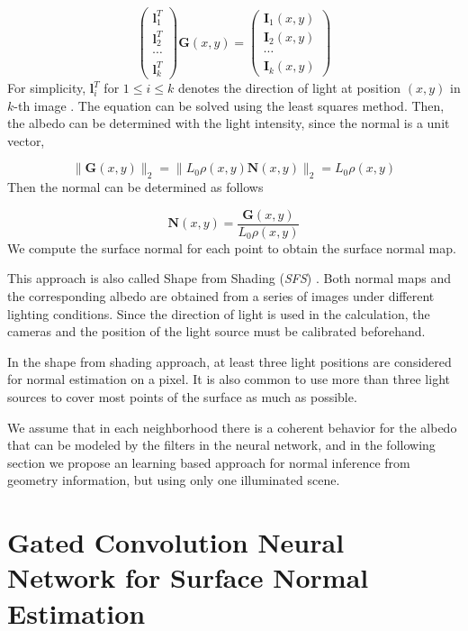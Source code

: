 \[ 
\begin{pmatrix}
	\textbf{l}_1^T \\
	\textbf{l}_2^T \\
	\cdots \\
	\textbf{l}_k^T
\end{pmatrix} \textbf{G}(x,y) = 
\begin{pmatrix}
	\textbf{I}_1(x,y) \\
	\textbf{I}_2(x,y) \\
	\cdots \\
	\textbf{I}_k(x,y)
\end{pmatrix}
\]
For simplicity, $ \textbf{l}_i^T $ for $ 1\le i \le k $ denotes the direction of light at position $ (x,y) $ in $ k $-th image . The equation can be solved using the least squares method. Then, the albedo can be determined with the light intensity, since the normal is a unit vector,

\[ \| \textbf{G}(x,y)\|_2 = \|L_0\rho(x,y)\textbf{N}(x,y)\|_2 = L_0\rho(x,y) \]
Then the normal can be determined as follows

\[ \textbf{N}(x,y) = \frac{\textbf{G}(x,y)}{L_0\rho(x,y)}\]
We compute the surface normal for each point to obtain the surface normal map. 

This approach is also called Shape from Shading (\textit{SFS}) \cite{SFS}. Both normal maps and the corresponding albedo are obtained from a series of images under different lighting conditions. Since the direction of light is used in the calculation, the cameras and the position of the light source must be calibrated beforehand. 

In the shape from shading approach, at least three light positions are considered for normal estimation on a pixel. It is also common to use more than three light sources to cover most points of the surface as much as possible. 

We assume that in each neighborhood there is a coherent behavior for the albedo that can be modeled by the filters in the neural network, and in the following section we propose an learning based approach for normal inference from geometry information, but using only one illuminated scene.


\newpage 
\section{Gated Convolution Neural Network for Surface Normal Estimation}
\label{sec:gcnn}

